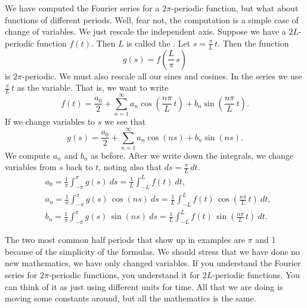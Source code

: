 We have computed the Fourier series for a $2\pi$-periodic function, but what
about functions of different periods.  Well, fear not, the computation is a
simple case of change of variables.  We just rescale the independent
axis.  Suppose we have a $2L$-periodic function $f(t)$.  Then $L$ is called
the \emph{}.  Let $s = \frac{\pi}{L} \, t$.
Then the function
\begin{equation*}
g(s) = f\left(\frac{L}{\pi}\,s \right)
\end{equation*}
is $2\pi$-periodic.  We must also rescale all our sines and cosines.
In the series we use $\frac{\pi}{L}\,t$ as the variable.  That is, we
want to write
\begin{equation*}
\boxed{~~
f(t) = 
\frac{a_0}{2} +
\sum_{n=1}^\infty a_n \cos \left( \frac{n \pi}{L}\, t \right)
+ b_n \sin \left(\frac{n \pi}{L} \, t \right) .
~~}
\end{equation*}
If we change variables to $s$ we see that
\begin{equation*}
g(s) = 
\frac{a_0}{2} +
\sum_{n=1}^\infty a_n \cos (n s)
+ b_n \sin (n s) .
\end{equation*}
We compute $a_n$ and $b_n$ as before.  After we write down the
integrals, we change variables from $s$ back to $t$, noting also
that $ds = \frac{\pi}{L} \, dt$.
\begin{equation*}
\boxed{~~
\begin{aligned}
& a_0 =
\frac{1}{\pi}
\int_{-\pi}^\pi
g(s) ~ ds
=
\frac{1}{L}
\int_{-L}^L
f(t) ~ dt , \\
& a_n =
\frac{1}{\pi}
\int_{-\pi}^\pi
g(s) \, \cos (n s) ~ ds
=
\frac{1}{L}
\int_{-L}^L
f(t) \, \cos \left( \frac{n \pi}{L}\, t \right) ~ dt , \\
& b_n =
\frac{1}{\pi}
\int_{-\pi}^\pi
g(s) \, \sin (n s) ~ ds
=
\frac{1}{L}
\int_{-L}^L
f(t) \, \sin \left( \frac{n \pi}{L}\, t \right) ~ dt .
\end{aligned}
~~}
\end{equation*}

The two most common half periods that show up in examples
are $\pi$ and 1 because of the simplicity of the formulas.  We should stress that we have
done no new mathematics, we have only changed variables.  If you understand 
the Fourier series for $2\pi$-periodic functions, you understand it for
$2L$-periodic functions.  You can think of it as just using
different units for time.  All that we are doing is moving some constants
around, but all the mathematics is the same.

